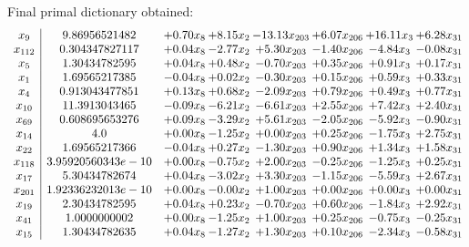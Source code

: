 \documentclass[8pt]{article}
\begin{document}
 Final primal dictionary obtained: 
\[\begin{array}{c| c c@{\hskip 2pt} c@{\hskip 2pt} c@{\hskip 2pt} c@{\hskip 2pt} c@{\hskip 2pt} c@{\hskip 2pt} }
 x_{9}   &  9.86956521482 & +  0.70 x_{8} & +  8.15 x_{2} & -13.13 x_{203} & +  6.07 x_{206} & + 16.11 x_{3} & +  6.28 x_{31}\\
 x_{112}   &  0.304347827117 & +  0.04 x_{8} & -2.77 x_{2} & +  5.30 x_{203} & -1.40 x_{206} & -4.84 x_{3} & -0.08 x_{31}\\
 x_{5}   &  1.30434782595 & +  0.04 x_{8} & +  0.48 x_{2} & -0.70 x_{203} & +  0.35 x_{206} & +  0.91 x_{3} & +  0.17 x_{31}\\
 x_{1}   &  1.69565217385 & -0.04 x_{8} & +  0.02 x_{2} & -0.30 x_{203} & +  0.15 x_{206} & +  0.59 x_{3} & +  0.33 x_{31}\\
 x_{4}   &  0.913043477851 & +  0.13 x_{8} & +  0.68 x_{2} & -2.09 x_{203} & +  0.79 x_{206} & +  0.49 x_{3} & +  0.77 x_{31}\\
 x_{10}   &  11.3913043465 & -0.09 x_{8} & -6.21 x_{2} & -6.61 x_{203} & +  2.55 x_{206} & +  7.42 x_{3} & +  2.40 x_{31}\\
 x_{69}   &  0.608695653276 & +  0.09 x_{8} & -3.29 x_{2} & +  5.61 x_{203} & -2.05 x_{206} & -5.92 x_{3} & -0.90 x_{31}\\
 x_{14}   &  4.0 & +  0.00 x_{8} & -1.25 x_{2} & +  0.00 x_{203} & +  0.25 x_{206} & -1.75 x_{3} & +  2.75 x_{31}\\
 x_{22}   &  1.69565217366 & -0.04 x_{8} & +  0.27 x_{2} & -1.30 x_{203} & +  0.90 x_{206} & +  1.34 x_{3} & +  1.58 x_{31}\\
 x_{118}   &  3.95920560343e-10 & +  0.00 x_{8} & -0.75 x_{2} & +  2.00 x_{203} & -0.25 x_{206} & -1.25 x_{3} & +  0.25 x_{31}\\
 x_{17}   &  5.30434782674 & +  0.04 x_{8} & -3.02 x_{2} & +  3.30 x_{203} & -1.15 x_{206} & -5.59 x_{3} & +  2.67 x_{31}\\
 x_{201}   &  1.92336232013e-10 & +  0.00 x_{8} & -0.00 x_{2} & +  1.00 x_{203} & +  0.00 x_{206} & +  0.00 x_{3} & +  0.00 x_{31}\\
 x_{19}   &  2.30434782595 & +  0.04 x_{8} & +  0.23 x_{2} & -0.70 x_{203} & +  0.60 x_{206} & -1.84 x_{3} & +  2.92 x_{31}\\
 x_{41}   &  1.0000000002 & +  0.00 x_{8} & -1.25 x_{2} & +  1.00 x_{203} & +  0.25 x_{206} & -0.75 x_{3} & -0.25 x_{31}\\
 x_{15}   &  1.30434782635 & +  0.04 x_{8} & -1.27 x_{2} & +  1.30 x_{203} & +  0.10 x_{206} & -2.34 x_{3} & -0.58 x_{31}\\

\end{array}\]
\end{document}
